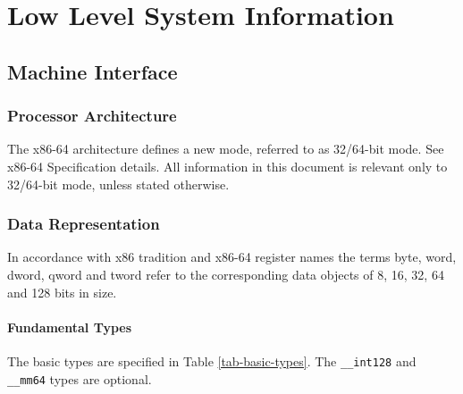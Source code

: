 
\chapter{Low Level System Information}

\section{Machine Interface}

\subsection{Processor Architecture}

The x86-64 architecture defines a new mode, referred to as 32/64-bit
mode. See x86-64 Specification details. All information in this
document is relevant only to 32/64-bit mode, unless stated otherwise.


\subsection{Data Representation}

In accordance with x86 tradition and x86-64 register names the terms
byte, word, dword, qword and tword refer to the corresponding data
objects of 8, 16, 32, 64 and 128 bits in size.


\subsubsection{Fundamental Types}

The basic types are specified in Table \ref{tab-basic-types}.  The
\verb|__int128| and \verb|__mm64| types are optional.


